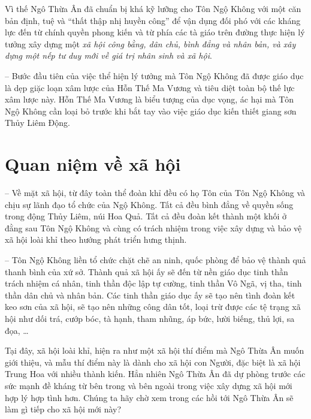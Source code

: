 Vì thế Ngô Thừa Ân đã chuẩn bị khá kỹ lưỡng cho Tôn Ngộ Không với một căn bản định, tuệ và ``thất thập nhị huyền công'' để vận dụng đối phó với các kháng lực đến từ chính quyền phong kiến và từ phía các tà giáo trên đường thực hiện lý tưởng xây dựng một \emph{xã hội công bằng, dân chủ, bình đẳng và nhân bản, và xây dựng một nếp tư duy mới về giá trị nhân sinh và xã hội}.

-- Bước đầu tiên của việc thể hiện lý tưởng mà Tôn Ngộ Không đã được giáo dục là dẹp giặc loạn xâm lược của Hỗn Thế Ma Vương và tiêu diệt toàn bộ thế lực xâm lược này. Hỗn Thế Ma Vương là biểu tượng của dục vọng, ác hại mà Tôn Ngộ Không cần loại bỏ trước khi bắt tay vào việc giáo dục kiến thiết giang sơn Thủy Liêm Động.


\section{Quan niệm về xã hội} %
\label{sec:2_quan_niem_ve_xa_hoi}

-- Về mặt xã hội, từ đây toàn thể đoàn khỉ đều có họ Tôn của Tôn Ngộ Không và chịu sự lãnh đạo tổ chức của Ngộ Không. Tất cả đều bình đẳng về quyền sống trong động Thủy Liêm, núi Hoa Quả. Tất cả đều đoàn kết thành một khối ở đằng sau Tôn Ngộ Không và cùng có trách nhiệm trong việc xây dựng và bảo vệ xã hội loài khỉ theo hướng phát triển hưng thịnh.

-- Tôn Ngộ Không liền tổ chức chặt chẽ an ninh, quốc phòng để bảo vệ thành quả thanh bình của xứ sở. Thành quả xã hội ấy sẽ đến từ nền giáo dục tinh thần trách nhiệm cá nhân, tinh thần độc lập tự cường, tinh thần Vô Ngã, vị tha, tinh thần dân chủ và nhân bản. Các tinh thần giáo dục ấy sẽ tạo nên tình đoàn kết keo sơn của xã hội, sẽ tạo nên những công dân tốt, loại trừ được các tệ trạng xã hội như dối trá, cướp bóc, tà hạnh, tham nhũng, áp bức, lười biếng, thủ lợi, sa đọa, \ldots

Tại đây, xã hội loài khỉ, hiện ra như một xã hội thí điểm mà Ngô Thừa Ân muốn giới thiệu, và mẫu thí điểm này là dành cho xã hội con Người, đặc biệt là xã hội Trung Hoa với nhiều thành kiến. Hẳn nhiên Ngô Thừa Ân đã dự phòng trước các sức mạnh đề kháng từ bên trong và bên ngoài trong việc xây dựng xã hội mới hợp lý hợp tình hơn. Chúng ta hãy chờ xem trong các hồi tới Ngô Thừa Ân sẽ làm gì tiếp cho xã hội mới này?
